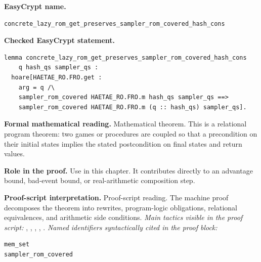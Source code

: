 \begin{formaltheorem}
\noindent\textbf{EasyCrypt name.}
\begin{lstlisting}[language=EasyCrypt,basicstyle=\ttfamily\scriptsize]
concrete_lazy_rom_get_preserves_sampler_rom_covered_hash_cons
\end{lstlisting}
\noindent\textbf{Checked EasyCrypt statement.}
\begin{lstlisting}[language=EasyCrypt,basicstyle=\ttfamily\scriptsize]
lemma concrete_lazy_rom_get_preserves_sampler_rom_covered_hash_cons
    q hash_qs sampler_qs :
  hoare[HAETAE_RO.FRO.get :
    arg = q /\
    sampler_rom_covered HAETAE_RO.FRO.m hash_qs sampler_qs ==>
    sampler_rom_covered HAETAE_RO.FRO.m (q :: hash_qs) sampler_qs].
\end{lstlisting}
\noindent\textbf{Formal mathematical reading.}
Mathematical theorem. This is a relational program theorem: two games or procedures are coupled so that a precondition on their initial states implies the stated postcondition on final states and return values.

\noindent\textbf{Role in the proof.}
Use in this chapter. It contributes directly to an advantage bound, bad-event bound, or real-arithmetic composition step.

\noindent\textbf{Proof-script interpretation.}
Proof-script reading. The machine proof decomposes the theorem into rewrites, program-logic obligations, relational equivalences, and arithmetic side conditions.
\emph{Main tactics visible in the proof script:} \ec{proc}, \ec{wp}, \ec{rnd}, \ec{rewrite}, \ec{smt}.
\emph{Named identifiers syntactically cited in the proof block:}
\begin{lstlisting}[language=EasyCrypt,basicstyle=\ttfamily\scriptsize]
mem_set
sampler_rom_covered
\end{lstlisting}

\end{formaltheorem}

